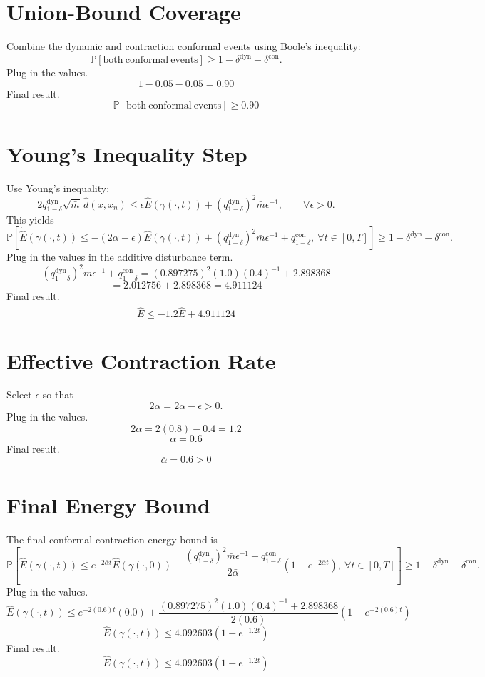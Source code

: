 \documentclass[11pt]{article}
\begin{document}
\section*{Union-Bound Coverage}

Combine the dynamic and contraction conformal events using Boole's inequality:
\[
\mathbb P[\mathrm{both\ conformal\ events}]
\ge
1-\delta^{\mathrm{dyn}}-\delta^{\mathrm{con}}.
\]
Plug in the values.
\[
1-0.05-0.05=0.90
\]
Final result.
\[
\boxed{\mathbb P[\mathrm{both\ conformal\ events}]\ge0.90}
\]

\section*{Young's Inequality Step}

Use Young's inequality:
\[
2q_{1-\delta}^{\mathrm{dyn}}\sqrt{\bar m}\,\hat d(x,x_n)
\le
\epsilon\hat E(\gamma(\cdot,t))
+\left(q_{1-\delta}^{\mathrm{dyn}}\right)^2\bar m\epsilon^{-1},
\qquad
\forall\epsilon>0.
\]
This yields
\[
\mathbb P\left[
\dot{\hat E}(\gamma(\cdot,t))
\le
-(2\alpha-\epsilon)\hat E(\gamma(\cdot,t))
+\left(q_{1-\delta}^{\mathrm{dyn}}\right)^2\bar m\epsilon^{-1}
+q_{1-\delta}^{\mathrm{con}},
\ \forall t\in[0,T]
\right]
\ge
1-\delta^{\mathrm{dyn}}-\delta^{\mathrm{con}}.
\]
Plug in the values in the additive disturbance term.
\[
\left(q_{1-\delta}^{\mathrm{dyn}}\right)^2\bar m\epsilon^{-1}
+q_{1-\delta}^{\mathrm{con}}
=
(0.897275)^2(1.0)(0.4)^{-1}+2.898368
\]
\[
=2.012756+2.898368=4.911124
\]
Final result.
\[
\boxed{
\dot{\hat E}
\le
-1.2\hat E+4.911124
}
\]

\section*{Effective Contraction Rate}

Select \(\epsilon\) so that
\[
2\bar\alpha=2\alpha-\epsilon>0.
\]
Plug in the values.
\[
2\bar\alpha=2(0.8)-0.4=1.2
\]
\[
\bar\alpha=0.6
\]
Final result.
\[
\boxed{\bar\alpha=0.6>0}
\]

\section*{Final Energy Bound}

The final conformal contraction energy bound is
\[
\mathbb P\left[
\hat E(\gamma(\cdot,t))
\le
e^{-2\bar\alpha t}\hat E(\gamma(\cdot,0))
+
\frac{
\left(q_{1-\delta}^{\mathrm{dyn}}\right)^2\bar m\epsilon^{-1}
+q_{1-\delta}^{\mathrm{con}}
}{
2\bar\alpha
}
\left(1-e^{-2\bar\alpha t}\right),
\ \forall t\in[0,T]
\right]
\ge
1-\delta^{\mathrm{dyn}}-\delta^{\mathrm{con}}.
\]
Plug in the values.
\[
\hat E(\gamma(\cdot,t))
\le
e^{-2(0.6)t}(0.0)
+
\frac{
(0.897275)^2(1.0)(0.4)^{-1}
+2.898368
}{
2(0.6)
}
\left(1-e^{-2(0.6)t}\right)
\]
\[
\hat E(\gamma(\cdot,t))
\le
4.092603\left(1-e^{-1.2t}\right)
\]
Final result.
\[
\boxed{
\hat E(\gamma(\cdot,t))
\le
4.092603\left(1-e^{-1.2t}\right)
}
\]
\end{document}
